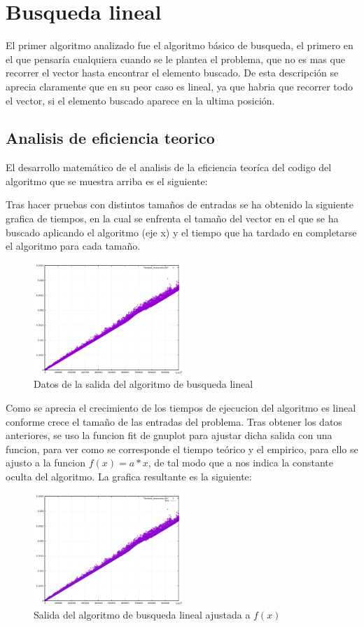 \section{Busqueda lineal}

El primer algoritmo analizado fue el algoritmo básico de busqueda, el primero en el que pensaría cualquiera cuando se le plantea el problema, que no es mas que recorrer el vector hasta encontrar el elemento buscado. De esta descripción se aprecia claramente que en su peor caso es lineal, ya que habria que recorrer todo el vector, si el elemento buscado aparece en la ultima posición.

\subsection{Analisis de eficiencia teorico}


El desarrollo matemático de el analisis de la eficiencia teoríca del codigo del algoritmo que se muestra arriba es el siguiente:


Tras hacer pruebas con distintos tamaños de entradas se ha obtenido la siguiente grafica de tiempos, en la cual se enfrenta el tamaño del vector en el que se ha buscado aplicando el algoritmo (eje x) y el tiempo que ha tardado en completarse el algoritmo para cada tamaño.

\begin{figure}[h]
  \centering
  \includegraphics[width=0.5\textwidth]{./Imagenes/busqueda_lineal.png}
  \caption{Datos de la salida del algoritmo de busqueda lineal}
\end{figure}

Como se aprecia el crecimiento de los tiempos de ejecucion del algoritmo es lineal conforme crece el tamaño de las entradas del problema. Tras obtener los datos anteriores, se uso la funcion fit de gnuplot para ajustar dicha salida con una funcion, para ver como se corresponde el tiempo teórico y el empirico, para ello se ajusto a la funcion $ f(x) = a*x$, de tal modo que a nos indica la constante oculta del algoritmo. La grafica resultante es la siguiente:

\begin{figure}[h]
  \centering
  \includegraphics[width=0.5\textwidth]{./Imagenes/busqueda_lineal_ajustada.png}
  \caption{Salida del algoritmo de busqueda lineal ajustada a $f(x)$}
\end{figure}
